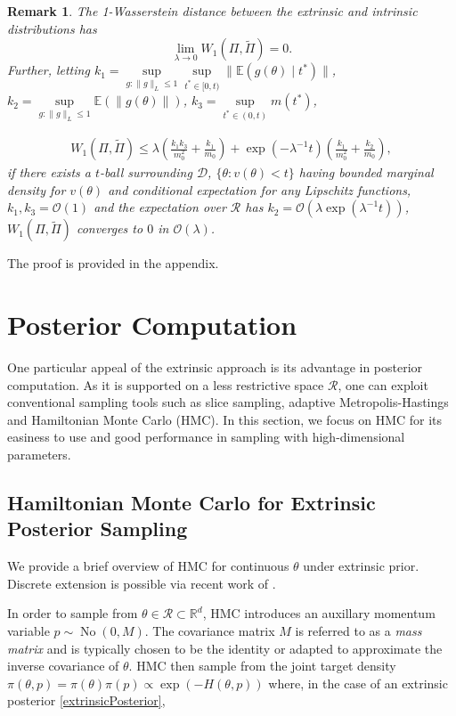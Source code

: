 \documentclass[10pt]{article}
\newtheorem{remark}{Remark}
\newcommand{\mc}[1]{\mathcal{#1}}
\DeclareMathOperator{\No}{No}
\DeclareMathOperator{\1}{\mathbbm{1}}
\newcommand{\mass}{M} %
\begin{document}
\begin{remark}
The 1-Wasserstein distance between the extrinsic and intrinsic distributions has
$$ \underset{\lambda \rightarrow 0}\lim W_1(\Pi,\tilde\Pi)=0.$$
Further,  letting $k_1=\underset{g:\|g\|_L\le 1}\sup\underset{t^*\in [0,t)}\sup \|\mathbb{E}(g(\theta) \mid t^*)\|$, $k_2=\underset{g:\|g\|_L\le 1} \sup \mathbb{E}(\| g(\theta )\|)$, $k_3= \underset{t^*\in (0,t)}\sup  m(t^{*})$,

\begin{equation}
\begin{aligned}
W_1(\Pi,\tilde\Pi) \le \lambda (\frac{k_1 k_3}{m_0^2} + \frac{k_1}{m_0}) + \exp(- \lambda^{-1} t )(\frac{k_1}{m_0^2} + \frac{k_2}{m_0}),
\end{aligned}
\end{equation}
if there exists a $t$-ball surrounding $\mc D$, $\{\theta: v(\theta)<t\}$ having bounded marginal density for $v(\theta)$ and conditional expectation for any Lipschitz functions, $k_1,k_3= \mc O(1)$ and the expectation over $\mc R$ has $k_2 = \mc O(\lambda \exp(\lambda^{-1} t))$, $W_1(\Pi,\tilde\Pi)$ converges to $0$ in $\mc O(\lambda)$.


\end{remark}

The proof is provided in the appendix.


\section{Posterior Computation}

One particular appeal of the extrinsic approach is its advantage in posterior computation. As it is supported on a less restrictive space $\mc R$, one can exploit conventional sampling tools such as slice sampling, adaptive Metropolis-Hastings and Hamiltonian Monte Carlo (HMC). In this section, we focus on HMC for its easiness to use and good performance in sampling with high-dimensional parameters.

\subsection{Hamiltonian Monte Carlo for Extrinsic Posterior Sampling}

We provide a brief overview of HMC for continuous $\theta$ under extrinsic prior. Discrete extension is possible via recent work of \cite{nishimura2017discontinuous}.

In order to sample from $\theta\in\mc R \subset \mathbb R^d$, HMC introduces an auxillary momentum variable $p \sim \No(0, \mass)$. The covariance matrix $\mass$ is referred to as a \textit{mass matrix} and is typically chosen to be the identity or adapted to approximate the inverse covariance of $\theta$. HMC then sample from the joint target density $\pi(\theta, p) = \pi(\theta) \pi(p) \propto \exp (- H(\theta, p))$ where, in the case of an extrinsic posterior \eqref{extrinsicPosterior}, 
\end{document}
